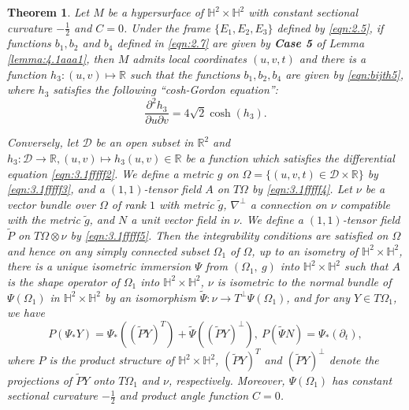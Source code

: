 \documentclass[reqno]{amsart}%
\newtheorem{theorem}{Theorem}[section]   %
\theoremstyle{definition}
\numberwithin{equation}{section}
\begin{document}
\begin{theorem}\label{thm:5.12a1}
Let $M$ be a hypersurface of $\mathbb{H}^2\times \mathbb{H}^2$ with constant sectional curvature $-\frac{1}{2}$ and $C=0$.
Under the frame $\{E_1,E_2,E_3\}$ defined by \eqref{eqn:2.5}, if functions $b_1,b_2$ and $b_4$ defined in \eqref{eqn:2.7} are given by {\bf Case 5} of Lemma \ref{lemma:4.1aaa1},
then $M$ admits local coordinates $(u,v,t)$
and there is a function $h_3:(u,v)\mapsto \mathbb{R}$
such that the functions $b_1,b_2,b_4$ are given by
\eqref{eqn:bijth5},
where $h_3$ satisfies the following ``cosh-Gordon equation'':
%
\begin{equation}\label{eqn:3.1fffff2}
\frac{\partial^2 h_3}{\partial u \partial v}
=4\sqrt{2}\cosh(h_3).
\end{equation}

Conversely, let $\mathcal{D}$ be an open subset in $\mathbb{R}^2$ and  $h_3:\mathcal{D}\to\mathbb{R}, (u,v)\mapsto h_3(u,v)\in\mathbb{R}$
be a function which satisfies the differential equation \eqref{eqn:3.1fffff2}.
We define a metric $g$ on $\Omega=\{(u,v,t)\in \mathcal{D}\times \mathbb{R}\}$ by
\eqref{eqn:3.1fffff3},
and a $(1,1)$-tensor field $A$ on $T\Omega$ by
\eqref{eqn:3.1fffff4}.
Let $\nu$ be a vector bundle over  $\Omega$ of rank $1$ with metric $\tilde{g}$, $\nabla ^{\perp} $ a connection on $\nu$ compatible with the metric $\tilde{g}$, and $N$ a unit vector field in $\nu$.   We define a $(1,1)$-tensor field $\tilde{P}$ on $T\Omega\otimes \nu$ by
\eqref{eqn:3.1fffff5}.
Then the integrability conditions are satisfied on $\Omega$ and hence on any simply
connected subset $\Omega_1$ of $\Omega$, up to an isometry of  $\mathbb{H}^2\times \mathbb{H}^2$, there is a unique isometric immersion $\Psi$ from $(\Omega_1,~g)$ into $\mathbb{H}^2\times \mathbb{H}^2$ such that $A$ is the shape operator of  $\Omega_1$ into $\mathbb{H}^2\times \mathbb{H}^2$, $\nu$ is isometric to the normal bundle of $\Psi(\Omega_1)$ in
$\mathbb{H}^2\times \mathbb{H}^2$ by an isomorphism $\tilde{\Psi}:\nu\to T^{\perp}\Psi(\Omega_1)$,
and for any $Y\in T\Omega_1$, we have
\begin{equation}
	P(\Psi_{*}Y)=\Psi_{*}((\tilde{P}Y)^{T})+\tilde{\Psi}((\tilde{P}Y)^{\perp}),~
	P(\tilde{\Psi}N)=\Psi_*(\partial_t),
\end{equation}
where $P$ is the product structure of $\mathbb{H}^2\times \mathbb{H}^2$, $(\tilde{P}Y)^{T}$ and $(\tilde{P}Y)^{\perp}$ denote the projections of  $\tilde{P}Y$ onto $T\Omega_1$ and $\nu$, respectively.
Moreover, $\Psi(\Omega_1)$ has constant sectional curvature $-\frac{1}{2}$ and product angle function $C=0$.
\end{theorem}
\end{document}
